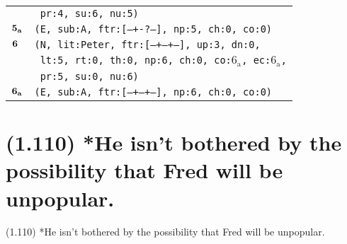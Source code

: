 \documentclass{article}
\begin{document}
\begin{minipage}{\textwidth}
{\begin{tabular}{|r|l|}
    & \texttt{\texttt{~pr:4,~su:6,~nu:5)}} \\
    ${\textbf{\textrm{5}}_{\textbf{\textrm{a}}}}$ & \texttt{\texttt{(E,~sub:A,~ftr:[---+-?---],~np:5,~ch:0,~co:0)}} \\
    ${\textbf{\textrm{6}}_{\phantom{z}}}$ & \texttt{\texttt{(N,~lit:Peter,~ftr:[---+--+--],~up:3,~dn:0,}} \\
    & \texttt{\texttt{~lt:5,~rt:0,~th:0,~np:6,~ch:0,~co:${\textrm{6}_{\textrm{a}}}$,~ec:${\textrm{6}_{\textrm{a}}}$,}} \\
    & \texttt{\texttt{~pr:5,~su:0,~nu:6)}} \\
    ${\textbf{\textrm{6}}_{\textbf{\textrm{a}}}}$ & \texttt{\texttt{(E,~sub:A,~ftr:[---+--+--],~np:6,~ch:0,~co:0)}} \\
    \hline
  \end{tabular}
  }
\end{minipage}
\bigbreak

\clearpage

%
%

\section*{(1.110) *He isn't bothered by the possibility that Fred will be unpopular.}

\bigbreak
\begin{enumerate*}
\item[(1.110)] *He isn't bothered by the possibility that Fred will be unpopular.
\end{enumerate*}
\bigbreak
\end{document}
